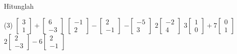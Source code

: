 \begin{exercise}
\pagebreak[2]
Hitunglah
\begin{tasks}(3)
\task
$\begin{bmatrix}
3 \\
1
\end{bmatrix}
+
\begin{bmatrix}
6 \\
-3
\end{bmatrix}
$
\task
$\begin{bmatrix}
-1 \\
2
\end{bmatrix}
-
\begin{bmatrix}
2 \\
-1
\end{bmatrix}
$
\task
$
-\begin{bmatrix}
-5 \\
3
\end{bmatrix}
$
\task
$
2\begin{bmatrix}
-2 \\
4
\end{bmatrix}
$
\task
$
3\begin{bmatrix}
1 \\
0
\end{bmatrix}
+
7
\begin{bmatrix}
0 \\
1
\end{bmatrix}
$
\task
$
2\begin{bmatrix}
2 \\
-3
\end{bmatrix}
-
6
\begin{bmatrix}
2 \\
-1
\end{bmatrix}
$
\end{tasks}
\end{exercise}

